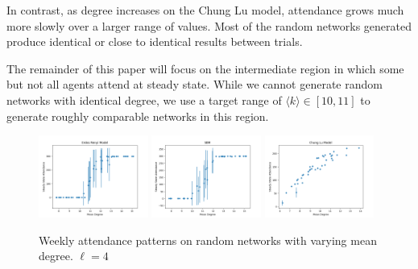 \documentclass[12pt]{article}
\begin{document}
In contrast, as degree increases on the Chung Lu model, attendance grows much more slowly over a larger range of values.  Most of the random networks generated produce identical or close to identical results between trials.

The remainder of this paper will focus on the intermediate region in which some but not all agents attend at steady state.  While we cannot generate random networks with identical degree, we use a target range of $\langle k \rangle \in [10, 11]$ to generate roughly comparable networks in this region.

\begin{figure}
  \includegraphics[width=0.32\textwidth]{erdos_renyi_degree.png}
  \includegraphics[width=0.32\textwidth]{sbm_degree.png}
  \includegraphics[width=0.32\textwidth]{chung_lu_degree.png}
  \caption{Weekly attendance patterns on random networks with varying mean degree.  $\ell = 4$}
\end{figure}
\end{document}
